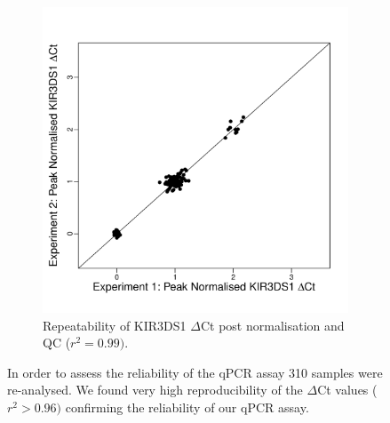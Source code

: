 \documentclass[12pt,a4paper,twoside]{article}
\begin{document}
\begin{figure}[h]
\begin{subfigure}[b]{.4\textwidth}
        \includegraphics[scale=.4] {figures/DS1-repeatability.pdf}
        \caption{Repeatability of KIR3DS1 $\Delta$Ct post normalisation and QC ($r^{2}=0.99)$.}
        \label{}
    \end{subfigure}
    \caption{
        \label{figure:repeatability}
        In order to assess the reliability of the qPCR assay 310 samples were re-analysed.
        We found very high reproducibility of the $\Delta$Ct values ($r^{2} > 0.96)$ confirming the reliability of our qPCR assay.
    }
\end{figure} 
\end{document}
